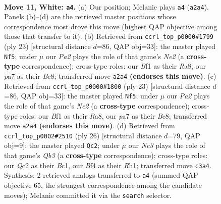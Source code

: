 \documentclass[11pt]{article}
\begin{document}
\clearpage

\begin{figure}[p]\centering
\begin{subfigure}{0.46\textwidth}\centering
\resizebox{\linewidth}{!}{%
\newchessgame
\chessboard[
  setfen={rnbqr2k/pp2bppp/2p5/3p4/3P1Bn1/1PN1P3/P1Q1NPPP/R3KB1R w KQ - 1 11},
  showmover=false,
  pgfstyle=straightmove, color=movearrow, markmove={a2-a4}
]}
\caption{}
\end{subfigure}\hfill
\begin{subfigure}{0.46\textwidth}\centering
\resizebox{\linewidth}{!}{%
\newchessgame
\chessboard[
  setfen={r1b1k2r/ppqpnpbp/4p1p1/3n4/2NPN3/2PB4/PP3PPP/R1BQK2R b KQkq - 3 12},
  showmover=false,
  pgfstyle=straightmove, color=movearrow, markmove={e7-f5}
]}
\caption{}
\end{subfigure}
\\[4pt]
\begin{subfigure}{0.46\textwidth}\centering
\resizebox{\linewidth}{!}{%
\newchessgame
\chessboard[
  setfen={r1b1k2r/ppqpnpbp/4p1p1/3n4/2NPN3/2PB4/PP3PPP/R1BQK2R b KQkq - 3 12},
  showmover=false,
  pgfstyle=straightmove, color=movearrow, markmove={e7-f5}
]}
\caption{}
\end{subfigure}\hfill
\begin{subfigure}{0.46\textwidth}\centering
\resizebox{\linewidth}{!}{%
\newchessgame
\chessboard[
  setfen={r1b1kn1r/ppq2pp1/2p2n1p/8/2NPp1P1/1QN1P3/PP2BP1b/R1B1K2R w Qkq - 2 14},
  showmover=false,
  pgfstyle=straightmove, color=movearrow, markmove={b3-c2}
]}
\caption{}
\end{subfigure}
\caption{\textbf{Move 11, White: \texttt{a4}.} (a) Our position; Melanie plays \texttt{a4} (\texttt{a2a4}). Panels (b)--(d) are the retrieved master positions whose correspondence most drove this move (highest QAP objective among those that transfer to it). (b) Retrieved from \texttt{ccrl\_top\_p0000\#1799} (ply 23) [structural distance $d$=86, QAP obj=33]: the master played \texttt{Nf5}; under $\mu$ our \emph{Pa2} plays the role of that game's \emph{Ne2} (a \textbf{cross-type} correspondence); cross-type roles: our \emph{B}f1 as their \emph{R}a8, our \emph{p}a7 as their \emph{B}c8; transferred move \texttt{a2a4} \textbf{(endorses this move)}. (c) Retrieved from \texttt{ccrl\_top\_p0000\#1800} (ply 23) [structural distance $d$=86, QAP obj=33]: the master played \texttt{Nf5}; under $\mu$ our \emph{Pa2} plays the role of that game's \emph{Ne2} (a \textbf{cross-type} correspondence); cross-type roles: our \emph{B}f1 as their \emph{R}a8, our \emph{p}a7 as their \emph{B}c8; transferred move \texttt{a2a4} \textbf{(endorses this move)}. (d) Retrieved from \texttt{ccrl\_top\_p0002\#2510} (ply 26) [structural distance $d$=79, QAP obj=9]: the master played \texttt{Qc2}; under $\mu$ our \emph{Nc3} plays the role of that game's \emph{Qb3} (a \textbf{cross-type} correspondence); cross-type roles: our \emph{Q}c2 as their \emph{B}c1, our \emph{B}f4 as their \emph{R}h1; transferred move \texttt{c3a4}. Synthesis: 2 retrieved analogs transferred to \texttt{a4} (summed QAP objective 65, the strongest correspondence among the candidate moves); Melanie committed it via the \texttt{search} selector.}
\label{fig:thought-m20}
\end{figure}
\end{document}
